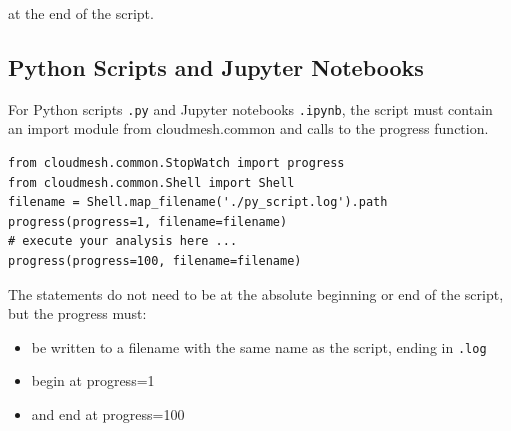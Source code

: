 at the end of the script.

\subsection{Python Scripts and Jupyter
Notebooks}\label{python-scripts-and-jupyter-notebooks}

For Python scripts \texttt{.py} and Jupyter notebooks \texttt{.ipynb},
the script must contain an import module from cloudmesh.common and calls
to the progress function.


\smallskip
\begin{verbatim}
from cloudmesh.common.StopWatch import progress
from cloudmesh.common.Shell import Shell
filename = Shell.map_filename('./py_script.log').path
progress(progress=1, filename=filename)
# execute your analysis here ...
progress(progress=100, filename=filename)
\end{verbatim}
\smallskip

The statements do not need to be at the absolute beginning or end of the
script, but the progress must:

\begin{itemize}
\item
  be written to a filename with the same name as the script, ending in
  \texttt{.log}
\item
  begin at progress=1
\item
  and end at progress=100
\end{itemize}
